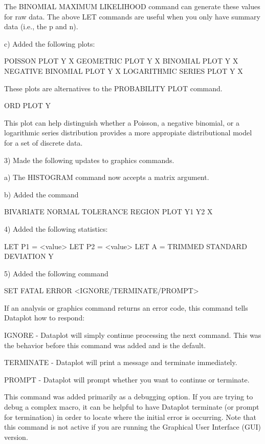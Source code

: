 {       The BINOMIAL MAXIMUM LIKELIHOOD command can generate
       these values for raw data.  The above LET commands are
       useful when you only have summary data (i.e., the p and n).

    c) Added the following plots:

          POISSON PLOT Y X
          GEOMETRIC PLOT Y X
          BINOMIAL PLOT Y X
          NEGATIVE BINOMIAL PLOT Y X
          LOGARITHMIC SERIES PLOT Y X

        These plots are alternatives to the PROBABILITY PLOT
        command.

          ORD PLOT Y

        This plot can help distinguish whether a Poisson,
        a negative binomial, or a logarithmic series
        distribution provides a more appropiate distributional
        model for a set of discrete data.

 3) Made the following updates to graphics commands.

    a) The HISTOGRAM command now accepts a matrix argument.

    b) Added the command

         BIVARIATE NORMAL TOLERANCE REGION PLOT Y1 Y2 X

 4) Added the following statistics:

       LET P1 = <value>
       LET P2 = <value>
       LET A = TRIMMED STANDARD DEVIATION Y

 5) Added the following command

       SET FATAL ERROR <IGNORE/TERMINATE/PROMPT>

    If an analysis or graphics command returns an error code,
    this command tells Dataplot how to respond:

       IGNORE - Dataplot will simply continue processing the
                next command.   This was the behavior before
                this command was added and is the default.

       TERMINATE - Dataplot will print a message and terminate
                   immediately.

       PROMPT - Dataplot will prompt whether you want to
                continue or terminate.

    This command was added primarily as a debugging option.
    If you are trying to debug a complex macro, it can be helpful
    to have Dataplot terminate (or prompt for termination)
    in order to locate where the initial error is occurring.
    Note that this command is not active if you are running
    the Graphical User Interface (GUI) version.

}
